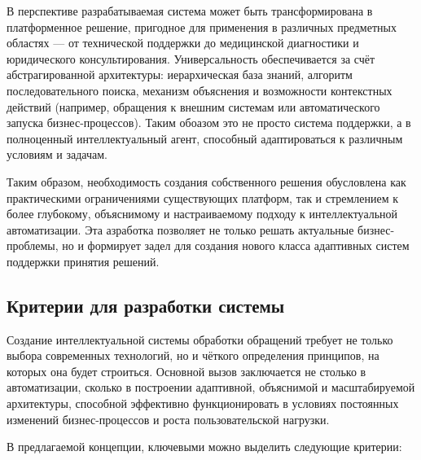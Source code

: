 В перспективе разрабатываемая система может быть трансформирована в платформенное решение, пригодное для применения в различных предметных областях — от технической поддержки до медицинской диагностики и юридического консультирования. Универсальность обеспечивается за счёт абстрагированной архитектуры: иерархическая база знаний, алгоритм последовательного поиска, механизм объяснения и возможности контекстных действий (например, обращения к внешним системам или автоматического запуска бизнес-процессов). Таким обоазом это не просто система поддержки, а в полноценный интеллектуальный агент, способный адаптироваться к различным условиям и задачам.

Таким образом, необходимость создания собственного решения обусловлена как практическими ограничениями существующих платформ, так и стремлением к более глубокому, объяснимому и настраиваемому подходу к интеллектуальной автоматизации. Эта азработка позволяет не только решать актуальные бизнес-проблемы, но и формирует задел для создания нового класса адаптивных систем поддержки принятия решений.

\subsection{Критерии для разработки системы}

Создание интеллектуальной системы обработки обращений требует не только выбора современных технологий, но и чёткого определения принципов, на которых она будет строиться. Основной вызов заключается не столько в автоматизации, сколько в построении адаптивной, объяснимой и масштабируемой архитектуры, способной эффективно функционировать в условиях постоянных изменений бизнес-процессов и роста пользовательской нагрузки.

В предлагаемой концепции, ключевыми можно выделить следующие критерии:

